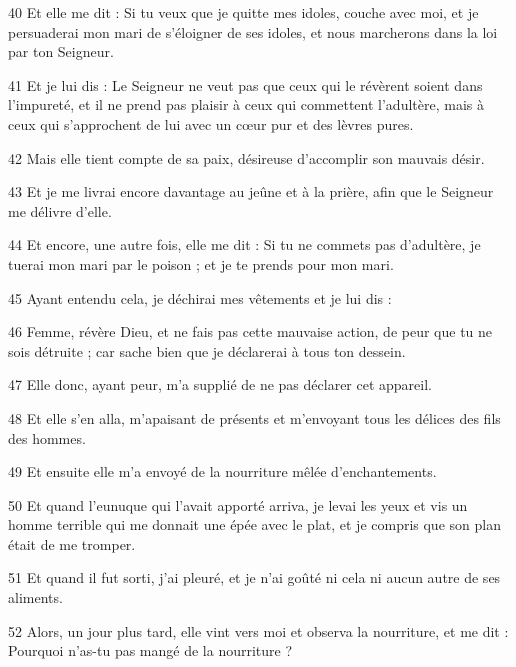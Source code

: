 \par 40 Et elle me dit : Si tu veux que je quitte mes idoles, couche avec moi, et je persuaderai mon mari de s'éloigner de ses idoles, et nous marcherons dans la loi par ton Seigneur.

\par 41 Et je lui dis : Le Seigneur ne veut pas que ceux qui le révèrent soient dans l'impureté, et il ne prend pas plaisir à ceux qui commettent l'adultère, mais à ceux qui s'approchent de lui avec un cœur pur et des lèvres pures.

\par 42 Mais elle tient compte de sa paix, désireuse d'accomplir son mauvais désir.

\par 43 Et je me livrai encore davantage au jeûne et à la prière, afin que le Seigneur me délivre d'elle.

\par 44 Et encore, une autre fois, elle me dit : Si tu ne commets pas d'adultère, je tuerai mon mari par le poison ; et je te prends pour mon mari.

\par 45 Ayant entendu cela, je déchirai mes vêtements et je lui dis :

\par 46 Femme, révère Dieu, et ne fais pas cette mauvaise action, de peur que tu ne sois détruite ; car sache bien que je déclarerai à tous ton dessein.

\par 47 Elle donc, ayant peur, m'a supplié de ne pas déclarer cet appareil.

\par 48 Et elle s'en alla, m'apaisant de présents et m'envoyant tous les délices des fils des hommes.

\par 49 Et ensuite elle m'a envoyé de la nourriture mêlée d'enchantements.

\par 50 Et quand l'eunuque qui l'avait apporté arriva, je levai les yeux et vis un homme terrible qui me donnait une épée avec le plat, et je compris que son plan était de me tromper.

\par 51 Et quand il fut sorti, j'ai pleuré, et je n'ai goûté ni cela ni aucun autre de ses aliments.

\par 52 Alors, un jour plus tard, elle vint vers moi et observa la nourriture, et me dit : Pourquoi n'as-tu pas mangé de la nourriture ?

